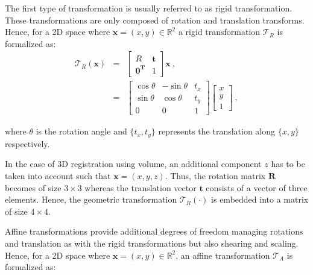 The first type of transformation is usually referred to as rigid transformation. These transformations are only composed of rotation and translation transforms. Hence, for a 2D space where $\mathbf{x} = (x,y) \in \mathbb{R}^2$ a rigid transformation $\mathcal{T}_R$ is formalized as:
\begin{eqnarray}
	\mathcal{T}_R(\mathbf{x}) & = & \begin{bmatrix}
		R & \mathbf{t} \\
		\mathbf{0^T} & 1
	\end{bmatrix} \mathbf{x} \ , \nonumber \\
	& = & \begin{bmatrix}
		\cos \theta & -\sin \theta & t_x \\
		\sin \theta & \cos \theta & t_y \\
		0 & 0 & 1
	\end{bmatrix}\begin{bmatrix}
		x \\
		y \\
		1
	\end{bmatrix} \ , \label{eq:rigtra} %
\end{eqnarray}

\noindent where $\theta$ is the rotation angle and $\{ t_x,t_y \}$ represents the translation along $\{x,y\}$ respectively.

In the case of 3D registration using volume, an additional component $z$ has to be taken into account such that $\mathbf{x} = (x,y,z)$. Thus, the rotation matrix $\mathbf{R}$ becomes of size $3 \times 3$ whereas the translation vector $\mathbf{t}$ consists of a vector of three elements. Hence, the geometric transformation $\mathcal{T}_R(\cdot)$ is embedded into a matrix of size $4 \times 4$.

Affine transformations provide additional degrees of freedom managing rotations and translation as with the rigid transformations but also shearing and scaling. Hence, for a 2D space where $\mathbf{x} = (x,y) \in \mathbb{R}^2$, an affine transformation $\mathcal{T}_A$ is formalized as: 

